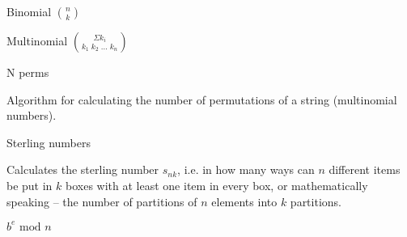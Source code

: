 

\begin{algorithm}{Binomial ${n \choose k}$}
\end{algorithm}

\begin{algorithm}{Multinomial
${\Sigma k_i \choose k_1\;k_2\;\ldots\;k_n}$}
\end{algorithm}

\begin{algorithm}{N perms}

Algorithm for calculating the number of permutations of a string
(multinomial numbers).
\end{algorithm}

\begin{algorithm}{Sterling numbers}

Calculates the sterling number $s_{nk}$, i.e. in how many ways can $n$
different items be put in $k$ boxes with at least one item in every box, or
mathematically speaking -- the number of partitions of $n$ elements into
$k$ partitions.
\end{algorithm}

\begin{algorithm}{$b^e \textrm{ mod } n$}
\end{algorithm}
